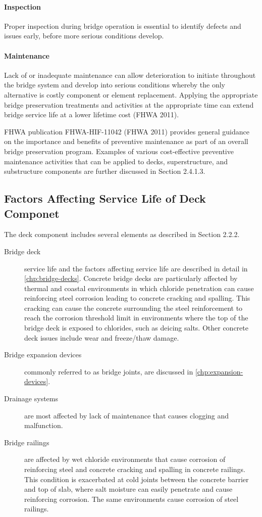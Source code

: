 \paragraph{Inspection}
Proper inspection during bridge operation is essential to identify defects and issues early, before more serious
conditions develop.

\paragraph{Maintenance}
Lack of or inadequate maintenance can allow deterioration to initiate throughout the bridge system and develop
into serious conditions whereby the only alternative is costly component or element replacement. Applying the
appropriate bridge preservation treatments and activities at the appropriate time can extend bridge service life at a
lower lifetime cost (FHWA 2011).

FHWA publication FHWA-HIF-11042 (FHWA 2011) provides general guidance on the importance and benefits
of preventive maintenance as part of an overall bridge preservation program. Examples of various cost-effective
preventive maintenance activities that can be applied to decks, superstructure, and substructure components are
further discussed in Section 2.4.1.3.

\subsection{Factors Affecting Service Life of Deck Componet}\label{subsec:factors-affect-deck}
The deck component includes several elements as described in Section 2.2.2.

\begin{description}
  \item [Bridge deck] service life and the factors affecting service life are described in detail in \cref{chp:bridge-decks}. Concrete
  bridge decks are particularly affected by thermal and coastal environments in which chloride penetration can cause
  reinforcing steel corrosion leading to concrete cracking and spalling. This cracking can cause the concrete
  surrounding the steel reinforcement to reach the corrosion threshold limit in environments where the top of the bridge
  deck is exposed to chlorides, such as deicing salts. Other concrete deck issues include wear and freeze/thaw damage.
  \item [Bridge expansion devices] commonly referred to as bridge joints, are discussed in \cref{chp:expansion-devices}.
  \item [Drainage systems] are most affected by lack of maintenance that causes clogging and malfunction.
  \item [Bridge railings] are affected by wet chloride environments that cause corrosion of reinforcing steel and concrete
  cracking and spalling in concrete railings. This condition is exacerbated at cold joints between the concrete barrier
  and top of slab, where salt moisture can easily penetrate and cause reinforcing corrosion. The same environments
  cause corrosion of steel railings.
\end{description}

